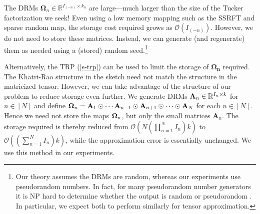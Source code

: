 \begin{remark}
The DRMs $\mathbf{\Omega}_n \in \mathbb{R}^{I_{(-n)} \times k_n}$
are large---much larger than the size of the Tucker factorization we seek!
Even using a low memory mapping such as the SSRFT and sparse random map,
the storage cost required grows as $\mathcal{O}(I_{(-n)})$.
However, we do not need to store these matrices.
Instead, we can generate (and regenerate) them as needed using a (stored) random seed.\footnote{
Our theory assumes the DRMs are random, whereas our experiments use
pseudorandom numbers. In fact, for many pseudorandom number generators
it is NP hard to determine whether the output is
random or pseudorandom \cite{arora2009computational}.
In particular, we expect both to perform similarly for tensor approximation.
}
\end{remark}

\begin{remark}
Alternatively, the TRP (\ref{s-trp}) can be used to limit the storage of $\mathbf{\Omega_n}$ required.
The Khatri-Rao structure in the sketch need not match the structure in the matricized tensor.
However, we can take advantage of the structure of our problem to reduce storage even further.
We generate DRMs $\mathbf{A}_n \in \mathbb{R}^{I_n \times k}$ for $n \in [N]$
and define
$\mathbf{\Omega}_n = \mathbf{A}_1 \odot \cdots \mathbf{A}_{n-1} \odot \mathbf{A}_{n+1} \odot \cdots \odot \mathbf{A}_N$ for each $n \in [N]$.
Hence we need not store the maps $\mathbf{\Omega}_n$, but only the
small matrices $\mathbf{A}_n$.
The storage required is thereby reduced from $\mathcal{O}(N(\prod_{n=1}^N I_n) k)$
to $\mathcal{O}((\sum_{n=1}^N I_n) k)$,
while the approximation error is essentially unchanged.
We use this method in our experiments.
\end{remark}

